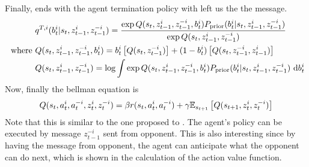 Finally, ends with the agent termination policy with left us the the message.
\begin{equation}
\begin{aligned}
    &q^{T,i}(b^i_t | s_t, z^i_{t-1}, z^{-i}_{t-1}) = \frac{\exp Q(s_t, z^i_{t-1}, z^{-i}_{t-1}, b^i_t) P_{\text{prior}}(b^i_t | s_t, z^i_{t-1}, z^{-i}_{t-1})}{\exp Q(s_t, z^i_{t-1}, z^{-i}_{t-1}) } \\
    \text{ where }&Q(s_t, z^i_{t-1}, z^{-i}_{t-1}, b^i_t)  = b^i_t\left[ Q(s_t,  z^{-i}_{t-1}) \right] + (1-b^i_t)\left[ Q(s_t,  z^{-i}_{t-1}, z^i_{t-1}) \right] \\
    &Q(s_t, z^i_{t-1}, z^{-i}_{t-1}) = \log \int \exp Q(s_t, z^i_{t-1}, z^{-i}_{t-1}, b^i_t) P_{\text{prior}}(b^i_t | s_t, z^i_{t-1}, z^{-i}_{t-1}) \ \mathrm{d} b^i_t
\end{aligned}
\end{equation}
Now, finally the bellman equation is 
\begin{equation}
    Q(s_t, a_t^i, a^{-i}_t, z^i_{t}, z^{-i}_{t} ) = \beta r(s_t, a_t^i, a^{-i}_t) + \gamma\mathbb{E}_{s_{t+1}}\left[ Q(s_{t+1}, z^i_{t}, z^{-i}_{t}) \right]
\end{equation}
Note that this is similar to the one proposed to \cite{han2019multi}. The agent's policy can be executed by message $z_{t-1}^{-i}$ sent from opponent. This is also interesting since by having the message from opponent, the agent can anticipate what the opponent can do next, which is shown in the calculation of the action value function.